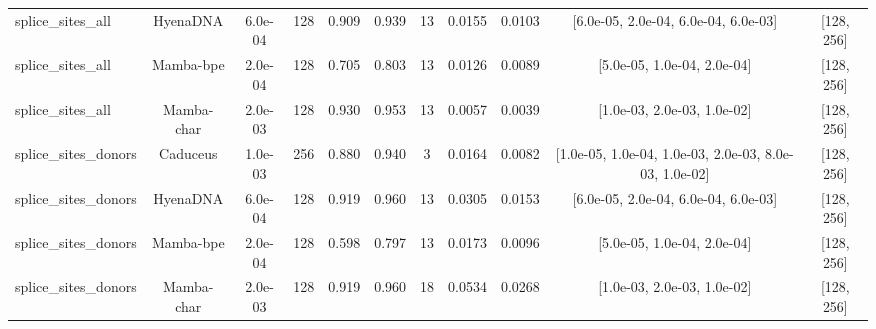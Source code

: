 \begin{landscape}
\begin{table}[]
\begin{tabular}{@{}lcccccccccc@{}}
splice\_sites\_all & HyenaDNA & 6.0e-04 & 128 & 0.909 & 0.939 & 13 & 0.0155 & 0.0103 & [6.0e-05, 2.0e-04, 6.0e-04, 6.0e-03] & [128, 256] \\
splice\_sites\_all & Mamba-bpe & 2.0e-04 & 128 & 0.705 & 0.803 & 13 & 0.0126 & 0.0089 & [5.0e-05, 1.0e-04, 2.0e-04] & [128, 256] \\
splice\_sites\_all & Mamba-char & 2.0e-03 & 128 & 0.930 & 0.953 & 13 & 0.0057 & 0.0039 & [1.0e-03, 2.0e-03, 1.0e-02] & [128, 256] \\
splice\_sites\_donors & Caduceus & 1.0e-03 & 256 & 0.880 & 0.940 & 3 & 0.0164 & 0.0082 & [1.0e-05, 1.0e-04, 1.0e-03, 2.0e-03, 8.0e-03, 1.0e-02] & [128, 256] \\
splice\_sites\_donors & HyenaDNA & 6.0e-04 & 128 & 0.919 & 0.960 & 13 & 0.0305 & 0.0153 & [6.0e-05, 2.0e-04, 6.0e-04, 6.0e-03] & [128, 256] \\
splice\_sites\_donors & Mamba-bpe & 2.0e-04 & 128 & 0.598 & 0.797 & 13 & 0.0173 & 0.0096 & [5.0e-05, 1.0e-04, 2.0e-04] & [128, 256] \\
splice\_sites\_donors & Mamba-char & 2.0e-03 & 128 & 0.919 & 0.960 & 18 & 0.0534 & 0.0268 & [1.0e-03, 2.0e-03, 1.0e-02] & [128, 256] \\
\bottomrule
\end{tabular}
\end{table}
\end{landscape}